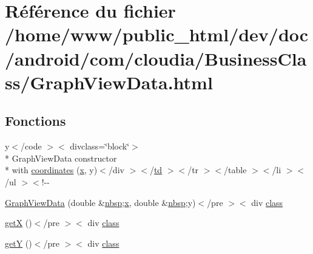 \hypertarget{_graph_view_data_8html}{\section{Référence du fichier /home/www/public\-\_\-html/dev/doc/android/com/cloudia/\-Business\-Class/\-Graph\-View\-Data.html}
\label{_graph_view_data_8html}
}
\subsection*{Fonctions}
\begin{DoxyCompactItemize}
\item 
y$<$/code $>$$<$ divclass=\char`\"{}block\char`\"{}$>$\\*
 Graph\-View\-Data constructor \\*
with \hyperlink{_graph_view_data_8html_aaa0131e4fefddd9b195f0978386999fe}{coordinates} (\hyperlink{_graph_view_data_8html_a9336ebf25087d91c818ee6e9ec29f8c1}{x}, y)$<$/div $>$$<$/\hyperlink{stylesheet_8css_a2635d454965afd759ce151c6f6d1a04a}{td} $>$$<$/tr $>$$<$/table $>$$<$/li $>$$<$/ul $>$$<$!-\/-\/
\item 
\hyperlink{_graph_view_data_8html_a3e68cb2cb5eaafd895fefb4f4c69df07}{Graph\-View\-Data} (double \&\hyperlink{_tools_8html_aef915316f784c9063d942974538301a6}{nbsp};\hyperlink{_graph_view_data_8html_a9336ebf25087d91c818ee6e9ec29f8c1}{x}, double \&\hyperlink{_tools_8html_aef915316f784c9063d942974538301a6}{nbsp};y)$<$/pre $>$$<$ div \hyperlink{_tools_8html_acf06f836132665ba8114f5a414c2403f}{class}
\item 
\hyperlink{_graph_view_data_8html_af8449ea4659d1c86ef681f379e765858}{get\-X} ()$<$/pre $>$$<$ div \hyperlink{_tools_8html_acf06f836132665ba8114f5a414c2403f}{class}
\item 
\hyperlink{_graph_view_data_8html_a7c1e015f262a606403ddbfd1369684e9}{get\-Y} ()$<$/pre $>$$<$ div \hyperlink{_tools_8html_acf06f836132665ba8114f5a414c2403f}{class}
\end{DoxyCompactItemize}
